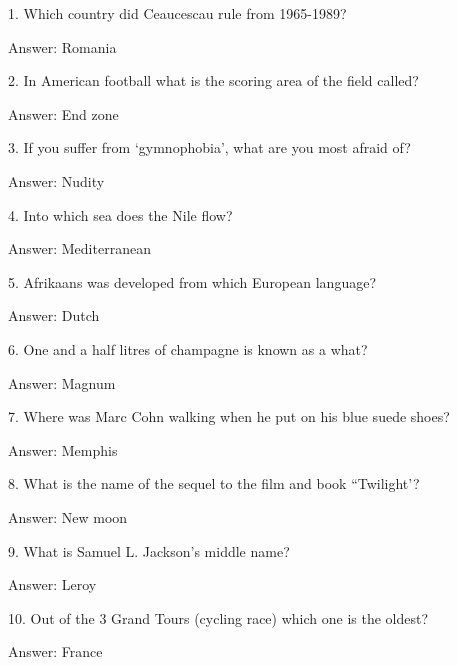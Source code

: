 \documentclass{beamer}
\begin{document}
    \begin{frame}
        1. Which country did Ceaucescau rule from 1965-1989?

        Answer: Romania
    \end{frame}

    \begin{frame}
        2. In American football what is the scoring area of the field called?

        Answer: End zone
    \end{frame}

    \begin{frame}
        3. If you suffer from `gymnophobia', what are you most afraid of?

        Answer: Nudity
    \end{frame}

    \begin{frame}
        4. Into which sea does the Nile flow?

        Answer: Mediterranean
    \end{frame}

    \begin{frame}
        5. Afrikaans was developed from which European language?

        Answer: Dutch
    \end{frame}

    \begin{frame}
        6. One and a half litres of champagne is known as a what?

        Answer: Magnum
    \end{frame}

    \begin{frame}
        7. Where was Marc Cohn walking when he put on his blue suede shoes?

        Answer: Memphis
    \end{frame}

    \begin{frame}
        8. What is the name of the sequel to the film and book ``Twilight'?

        Answer: New moon
    \end{frame}

    \begin{frame}
        9. What is Samuel L. Jackson's middle name?

        Answer: Leroy
    \end{frame}

    \begin{frame}
        10. Out of the 3 Grand Tours (cycling race) which one is the oldest?

        Answer: France
    \end{frame}
\end{document}
